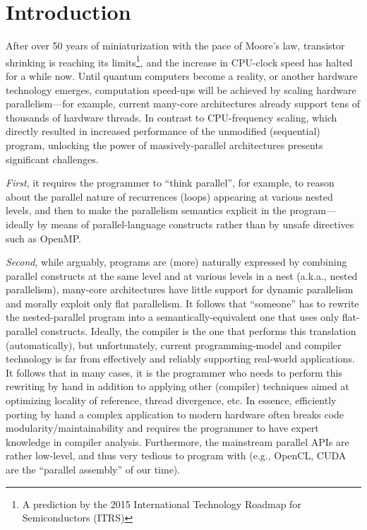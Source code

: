 \chapter{Introduction}
\label{chapter:Introduction}
After over 50 years of miniaturization with the pace of Moore's law\cite{cmcoic}, transistor shrinking is reaching its limits\footnote{A prediction by the 2015 International Technology Roadmap for Semiconductors (ITRS)}, and the increase in CPU-clock speed has halted for a while now. Until quantum computers become a reality, or another hardware technology emerges, computation speed-ups will be achieved by scaling hardware parallelism---for example, current many-core architectures already support tens of thousands of hardware threads.   In contrast to CPU-frequency scaling, which directly resulted in increased performance of the unmodified (sequential) program, unlocking the power of massively-parallel architectures presents significant challenges.   

{\em First}, it requires the programmer to ``think parallel'', for example, to reason about the parallel nature of recurrences (loops) appearing at various nested levels, and then to make the parallelism semantics explicit in the program---ideally by means of parallel-language constructs rather than by unsafe directives such as OpenMP.

{\em Second}, while arguably, programs are (more) naturally expressed by combining parallel constructs at the same level and at various levels in a nest (a.k.a., nested parallelism), many-core architectures have little support for dynamic parallelism and morally exploit only flat parallelism. It follows that ``someone'' has to rewrite the nested-parallel program into a semantically-equivalent one that uses only flat-parallel constructs. Ideally, the compiler is the one that performs this translation (automatically), but unfortunately, current programming-model and compiler technology is far from effectively and reliably supporting real-world applications. It follows that in many cases, it is the programmer who needs to perform this rewriting by hand in addition to applying other (compiler) techniques aimed at optimizing locality of reference, thread divergence, etc. In essence, efficiently porting by hand a complex application to modern hardware often breaks code modularity/maintainability and requires the programmer to have expert knowledge in compiler analysis. Furthermore, the mainstream parallel APIs are rather low-level, and thus very tedious to program with (e.g., OpenCL, CUDA are the ``parallel assembly'' of our time). 

